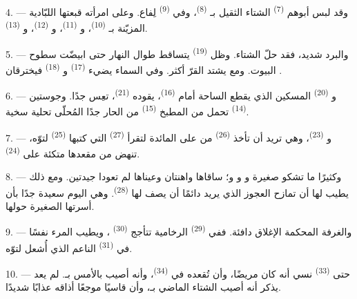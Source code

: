 4. --- وقد لبس أبوهم  \textsuperscript{(7)} الشتاء الثقيل
بـ \textsuperscript{(8)}، وفي 
\textsuperscript{(9)} لِفاع. وعلى امرأته قبعتها اللبّادية المزيّنة
بـ \textsuperscript{(10)}، و \textsuperscript{(11)}،
و \textsuperscript{(12)}، و
\textsuperscript{(13)}.

5. --- والبرد شديد، فقد حلّ الشتاء. وظل  \textsuperscript{(19)}
يتساقط طوال النهار حتى ابيضّت سطوح البيوت. ومع  يشتد القرّ
أكثر. وفي السماء يضيء  \textsuperscript{(17)} و
\textsuperscript{(18)} فيخترقان .

\VUsaut{4.2mm}
\VUsaut{3.0mm}

6. --- و \textsuperscript{(20)} المسكين الذي يقطع الساحة أمام
 \textsuperscript{(16)}، يقوده  \textsuperscript{(21)}،
تعِس جدًا. وجوستين  \textsuperscript{(14)} تحمل من المطبخ
 \textsuperscript{(15)} من  الحار جدًا
المُحلّى تحلية سخية.

7. --- و \textsuperscript{(23)}، وهي تريد أن تأخذ 
\textsuperscript{(26)} من على المائدة لتقرأ  \textsuperscript{(27)}
التي كتبها  \textsuperscript{(25)} لتوّه، تنهض من مقعدها متكئة
على  \textsuperscript{(24)}.

8. --- وكثيرًا ما تشكو  صغيرة و
و و؛ ساقاها واهنتان وعيناها لم تعودا
جيدتين. ومع ذلك يطيب لها أن تمازح  العجوز الذي يريد دائمًا
أن يصف لها  \textsuperscript{(28)}. وهي اليوم سعيدة جدًا بأن
أسرتها الصغيرة حولها.

9. --- والغرفة المحكمة الإغلاق دافئة. ففي  \textsuperscript{(29)}
الرخامية تتأجج  \textsuperscript{(30)} ، ويطيب المرء
نفسًا في   \textsuperscript{(31)} الناعم الذي أُشعل
لتوّه.

\VUsaut{4.2mm}
\VUsaut{3.0mm}

10. --- حتى  \textsuperscript{(33)} نسي أنه كان مريضًا، وأن
 تُقعده في  \textsuperscript{(34)}، وأنه أصيب
بالأمس بـ. لم يعد يذكر أنه أصيب الشتاء الماضي
بـ، وأن  قاسيًا موجعًا أذاقه عذابًا شديدًا.

